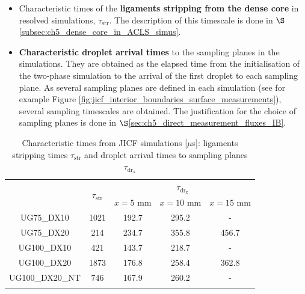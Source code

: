 \begin{itemize}

	\item  Characteristic times of the \textbf{ligaments stripping from the dense core} in resolved simulations, $\tau_\mathrm{str}$. The description of this timescale is done in $\S$\ref{subsec:ch5_dense_core_in_ACLS_simus}.
	
	\item \textbf{Characteristic droplet arrival times} to the sampling planes in the simulations. They are obtained as the elapsed time from the initialisation of the two-phase simulation to the arrival of the first droplet to each sampling plane. As several sampling planes are defined in each simulation (see for example Figure \ref{fig:jicf_interior_boundaries_surface_measurements}), several sampling timescales are obtained.  The justification for the choice of sampling planes is done in $\S$\ref{sec:ch5_direct_measurement_fluxes_IB}.


\end{itemize}

\clearpage



\begin{table}[!h]
\centering
\caption{Characteristic times from JICF simulations [$\mu$s]: ligaments stripping times $\tau_\mathrm{str}$ and droplet arrival times to sampling planes $\tau_\mathrm{dr_x}$ }
\begin{tabular}{ccccc}
\thickhline
\multirow{2}{*}{ \textbf{Case}} & \multirow{2}{*}{ $\tau_\mathrm{str}$} &  \multicolumn{3}{c}{$\tau_\mathrm{dr_x}$} \\
\cline{3-5}
 & & $x = 5$ mm & $x = 10$ mm & $x = 15$ mm  \\
\thickhline 
UG75\_DX10  & 1021 & 192.7 & 295.2 & -  \\
UG75\_DX20  & 214 & 234.7 & 355.8 & 456.7 \\
UG100\_DX10 & 421 & 143.7 & 218.7 & - \\
UG100\_DX20 & 1873 & 176.8 & 258.4 & 362.8 \\
UG100\_DX20\_NT & 746 & 167.9 & 260.2 & - \\
\thickhline
\end{tabular}
\label{tab:jicf_characteristic_droplet_sampling_times}
\end{table}

